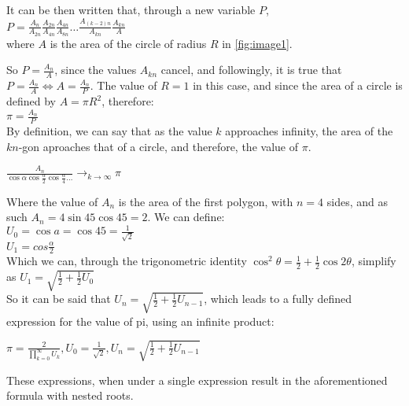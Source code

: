 It can be then written that, through a new variable $P$, \\
$P = \frac{A_{n}}{A_{2n}} \frac{A_{2n}}{A_{4n}} \frac{A_{4n}}{A_{8n}} \dots \frac{A_{(k-2)n}}{A_{kn}} \frac{A_{kn}}{A}$ \\
where $A$ is the area of the circle of radius $R$ 
in \ref{fig:image1}. 

So $P = \frac{A_{n}}{A}$, since the values $A_{kn}$ cancel, and 
followingly, it is true that $P = \frac{A_{n}}{A} \Leftrightarrow A = \frac{A_{n}}{P}$. The 
value of $R = 1$ in this case, and since the area of a circle is defined 
by $A = \pi R^2$, therefore: \\
$\pi = \frac{A_{n}}{P}$ \\
By definition, we can say that as the value $k$ approaches infinity, the area of the $kn$-gon 
aproaches that of a circle, and therefore, the value of $\pi$.

$\frac{A_{n}}{\cos{\alpha} \cos{\frac{\alpha}{2}} \cos{\frac{\alpha}{4}} \dots}
\to_{k \to \infty} \pi$

Where the value of $A_{n}$ is the area of the first polygon, with $n=4$ sides, and as such 
$A_{n} = 4 \sin{45} \cos{45} = 2$. We can define: \\
$U_{0} = \cos{a} = \cos{45} = \frac{1}{\sqrt{2}}$ \\
$U_{1} = cos{\frac{\alpha}{2}}$ \\
Which we can, through the trigonometric identity 
$\cos^2{\theta} = \frac{1}{2} + \frac{1}{2} \cos{2\theta}$, simplify as
$U_{1} = \sqrt{\frac{1}{2} + \frac{1}{2} U_{0}}$ \\
So it can be said that $U_{n} = \sqrt{\frac{1}{2} + \frac{1}{2} U_{n - 1}}$, which leads to 
a fully defined expression for the value of pi, using an infinite product: 

$\pi = \frac{2}{\prod\limits_{k=0}^\infty U_{k}}, U_{0} = \frac{1}{\sqrt{2}}, U_{n} = \sqrt{\frac{1}{2} + \frac{1}{2} U_{n - 1}}$ \footnotemark

These expressions, when under a single expression result in the aforementioned 
formula with nested roots.  



